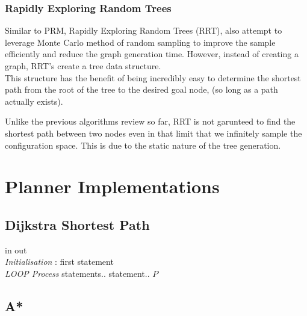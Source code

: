 \documentclass[journal]{IEEEtran}
\begin{document}
\subsubsection{Rapidly Exploring Random Trees}
Similar to PRM, Rapidly Exploring Random Trees (RRT), also attempt to leverage Monte Carlo method of random sampling to improve the sample efficiently and reduce the graph generation time. However, instead of creating a graph, RRT's create a tree data structure. \\

This structure has the benefit of being incredibly easy to determine the shortest path from the root of the tree to the desired goal node, (so long as a path actually exists).

Unlike the previous algorithms review so far, RRT is not garunteed to find the shortest path between two nodes even in that limit that we infinitely sample the configuration space. This is due to the static nature of the tree generation. 

\section{Planner Implementations}

\subsection{Dijkstra Shortest Path}
\label{Dijkstra}
\begin{algorithm}
  \caption{Dijkstra's Shortest Path}
  \begin{algorithmic}[1]
  \renewcommand{\algorithmicrequire}{\textbf{Input:}}
  \renewcommand{\algorithmicensure}{\textbf{Output:}}
  \REQUIRE in
  \ENSURE  out
  \\ \textit{Initialisation} :
   \STATE first statement
  \\ \textit{LOOP Process}
   \STATE statements..
   \STATE statement..
   \ENDIF
   \ENDFOR
  \RETURN $P$ 
  \end{algorithmic} 
  \end{algorithm}
\subsection{A*}

\end{document}
